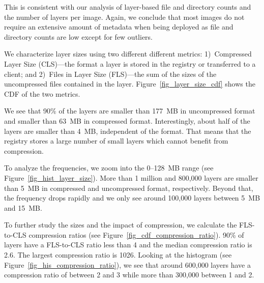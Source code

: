 This is consistent with our analysis of layer-based file and directory counts
and the number of layers per image. Again, we conclude that most images
do not require an extensive amount of metadata when being deployed as file and
directory counts are low except for few outliers.

We characterize layer sizes using two different different metrics:
%
1)~Compressed Layer Size (CLS)---the format a layer is stored in the registry or
transferred to a client;
%
%
and 2)~Files in Layer Size (FLS)---the sum of the sizes of the uncompressed files contained
in the layer.
%
Figure~\ref{fig_layer_size_cdf} shows the CDF of the two metrics.


We see that 90\% of the layers are smaller than 177~MB in uncompressed 
format and smaller than 63~MB in compressed format.
%
Interestingly, about half of the layers are smaller than 4~MB, independent
of the format. That means that the registry stores a large number of
small layers which cannot benefit from compression.

To analyze the frequencies, we zoom into the 0--128~MB range
(see Figure~\ref{fig_hist_layer_size}).
%
More than 1 million and 800,000 layers are smaller than 5~MB
in compressed and uncompressed format, respectively. Beyond that,
the frequency drops rapidly and we only see around 100,000 layers
between 5~MB and 15~MB.

%


To further study the sizes and the impact of compression, we calculate
the FLS-to-CLS compression ratios (see Figure~\ref{fig_cdf_compression_ratio}).
%
%
90\% of layers have a  FLS-to-CLS ratio less than 4 and the median
compression ratio is 2.6. The largest compression ratio is 1026.
%
%
%
%
Looking at the histogram (see Figure~\ref{fig_his_compression_ratio}), we see
that around 600,000 layers have a compression ratio of between 2 and 3 while more than
300,000 between 1 and 2.
%


